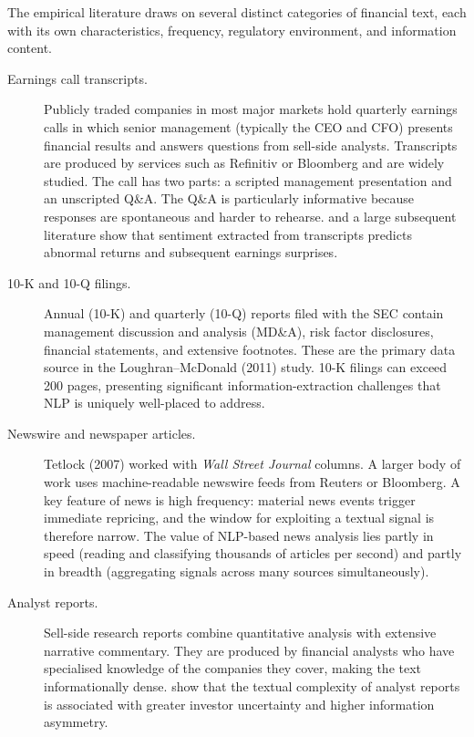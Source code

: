 \begin{context}
The empirical literature draws on several distinct categories of financial text, each
with its own characteristics, frequency, regulatory environment, and information content.

\begin{description}
  \item[Earnings call transcripts.] Publicly traded companies in most major markets
    hold quarterly earnings calls in which senior management (typically the CEO and CFO)
    presents financial results and answers questions from sell-side analysts.  Transcripts
    are produced by services such as Refinitiv or Bloomberg and are widely studied.  The
    call has two parts: a scripted management presentation and an unscripted Q\&A.  The
    Q\&A is particularly informative because responses are spontaneous and harder to
    rehearse.  \citet{davis2015effect} %
    and a large subsequent literature show that sentiment extracted from transcripts
    predicts abnormal returns and subsequent earnings surprises.

  \item[10-K and 10-Q filings.] Annual (10-K) and quarterly (10-Q) reports filed with
    the SEC contain management discussion and analysis (MD\&A), risk factor disclosures,
    financial statements, and extensive footnotes.  These are the primary data source in
    the Loughran--McDonald (2011) study.  10-K filings can exceed 200 pages, presenting
    significant information-extraction challenges that NLP is uniquely well-placed to
    address.

  \item[Newswire and newspaper articles.] Tetlock (2007) worked with \emph{Wall Street
    Journal} columns.  A larger body of work uses machine-readable newswire feeds from
    Reuters or Bloomberg.  A key feature of news is high frequency: material news events
    trigger immediate repricing, and the window for exploiting a textual signal is
    therefore narrow.  The value of NLP-based news analysis lies partly in speed (reading
    and classifying thousands of articles per second) and partly in breadth (aggregating
    signals across many sources simultaneously).

  \item[Analyst reports.] Sell-side research reports combine quantitative analysis with
    extensive narrative commentary.  They are produced by financial analysts who have
    specialised knowledge of the companies they cover, making the text informationally
    dense.  \citet{lehavy2011benefit} %
    show that the textual complexity of analyst reports is associated with greater investor
    uncertainty and higher information asymmetry.


\end{description}
\end{context}

